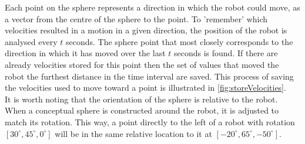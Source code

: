 \documentclass{article}
\begin{document}
Each point on the sphere represents a direction in which the robot could move, as a vector from the centre of the sphere to the point. To 'remember' which velocities resulted in a motion in a given direction, the position of the robot is analysed every $t$ seconds. The sphere point that most closely corresponds to the direction in which it has moved over the last $t$ seconds is found. If there are already velocities stored for this point then the set of values that moved the robot the furthest distance in the time interval are saved. This process of saving the velocities used to move toward a point is illustrated in \autoref{fig:storeVelocities}. \\
It is worth noting that the orientation of the sphere is relative to the robot. When a conceptual sphere is constructed around the robot, it is adjusted to match its rotation. This way, a point directly to the left of a robot with rotation $[30^\circ, 45^\circ, 0^\circ]$ will be in the same relative location to it at $[-20^\circ, 65^\circ, -50^\circ]$. \\
\end{document}
